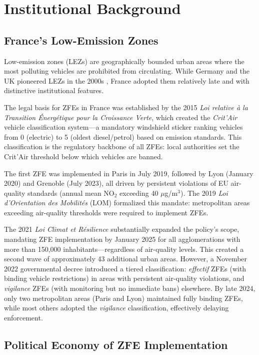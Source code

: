 \documentclass[12pt]{article}
\begin{document}
\section{Institutional Background}

\subsection{France's Low-Emission Zones}

Low-emission zones (LEZs) are geographically bounded urban areas where the most polluting vehicles are prohibited from circulating. While Germany and the UK pioneered LEZs in the 2000s \citep{gehrsitz2017effect, wolff2014environmental}, France adopted them relatively late and with distinctive institutional features.

The legal basis for ZFEs in France was established by the 2015 \textit{Loi relative \`a la Transition \'Energ\'etique pour la Croissance Verte}, which created the \textit{Crit'Air} vehicle classification system---a mandatory windshield sticker ranking vehicles from 0 (electric) to 5 (oldest diesel/petrol) based on emission standards. This classification is the regulatory backbone of all ZFEs: local authorities set the Crit'Air threshold below which vehicles are banned.

The first ZFE was implemented in Paris in July 2019, followed by Lyon (January 2020) and Grenoble (July 2023), all driven by persistent violations of EU air-quality standards (annual mean NO$_2$ exceeding 40 $\mu$g/m$^3$). The 2019 \textit{Loi d'Orientation des Mobilit\'es} (LOM) formalized this mandate: metropolitan areas exceeding air-quality thresholds were required to implement ZFEs.

The 2021 \textit{Loi Climat et R\'esilience} substantially expanded the policy's scope, mandating ZFE implementation by January 2025 for all agglomerations with more than 150,000 inhabitants---regardless of air-quality levels. This created a second wave of approximately 43 additional urban areas. However, a November 2022 governmental decree introduced a tiered classification: \textit{effectif} ZFEs (with binding vehicle restrictions) in areas with persistent air-quality violations, and \textit{vigilance} ZFEs (with monitoring but no immediate bans) elsewhere. By late 2024, only two metropolitan areas (Paris and Lyon) maintained fully binding ZFEs, while most others adopted the \textit{vigilance} classification, effectively delaying enforcement.

\subsection{Political Economy of ZFE Implementation}
\end{document}
